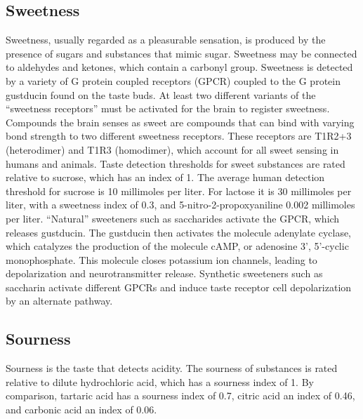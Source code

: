 \documentclass[]{book}
\begin{document}
\hypertarget{sweetness}{%
\subsection{Sweetness}\label{sweetness}}

Sweetness, usually regarded as a pleasurable sensation, is produced by the presence of sugars and substances that mimic sugar. Sweetness may be connected to aldehydes and ketones, which contain a carbonyl group. Sweetness is detected by a variety of G protein coupled receptors (GPCR) coupled to the G protein gustducin found on the taste buds. At least two different variants of the ``sweetness receptors'' must be activated for the brain to register sweetness. Compounds the brain senses as sweet are compounds that can bind with varying bond strength to two different sweetness receptors. These receptors are T1R2+3 (heterodimer) and T1R3 (homodimer), which account for all sweet sensing in humans and animals. Taste detection thresholds for sweet substances are rated relative to sucrose, which has an index of 1. The average human detection threshold for sucrose is 10 millimoles per liter. For lactose it is 30 millimoles per liter, with a sweetness index of 0.3, and 5-nitro-2-propoxyaniline 0.002 millimoles per liter. ``Natural'' sweeteners such as saccharides activate the GPCR, which releases gustducin. The gustducin then activates the molecule adenylate cyclase, which catalyzes the production of the molecule cAMP, or adenosine 3', 5'-cyclic monophosphate. This molecule closes potassium ion channels, leading to depolarization and neurotransmitter release. Synthetic sweeteners such as saccharin activate different GPCRs and induce taste receptor cell depolarization by an alternate pathway.

\hypertarget{sourness}{%
\subsection{Sourness}\label{sourness}}

Sourness is the taste that detects acidity. The sourness of substances is rated relative to dilute hydrochloric acid, which has a sourness index of 1. By comparison, tartaric acid has a sourness index of 0.7, citric acid an index of 0.46, and carbonic acid an index of 0.06.
\end{document}
